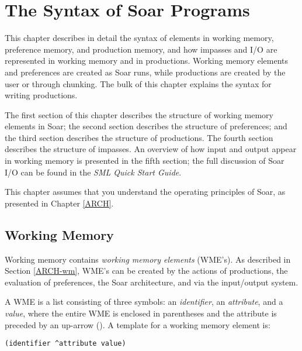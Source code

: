 \chapter{The Syntax of Soar Programs}
\label{SYNTAX}

This chapter describes in detail the syntax of elements in working
memory, preference memory, and production memory, and how impasses and
I/O are represented in working memory and in productions. Working memory
elements and preferences are created as Soar runs, while productions are
created by the user or through chunking. The bulk of this chapter
explains the syntax for writing productions.

The first section of this chapter describes the structure of working
memory elements in Soar; the second section describes the structure of
preferences; and the third section describes the structure of
productions. The fourth section describes the structure of impasses.
An overview of how input and output appear in working memory is
presented in the fifth section; the full discussion of Soar I/O can be
found in the \textit{SML Quick Start Guide}.

This chapter assumes that you understand the operating principles of
Soar, as presented in Chapter \ref{ARCH}.

\section{Working Memory}
\label{SYNTAX-wm}

Working memory contains \emph{working memory elements} (WME's). As
described in Section \ref{ARCH-wm}, WME's can be created by the actions of 
productions, the evaluation of preferences, the Soar
architecture, and via the input/output system.

A WME is a list consisting of three symbols: an {\em identifier}, an
\emph{attribute}, and a \emph{value}, where the entire WME is enclosed in
parentheses and the attribute is preceded by an up-arrow (\carat ).
A template for a working memory element is:
\begin{verbatim}
(identifier ^attribute value)
\end{verbatim}

